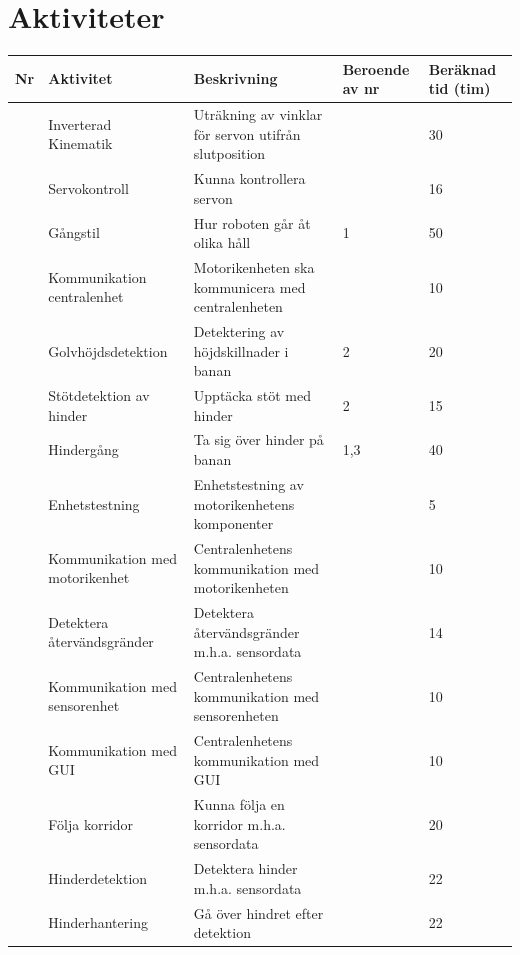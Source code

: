 \documentclass[a4paper,titlepage,12pt]{article}
\newcounter{aktNr}
\newcommand{\nextAktNr}{\stepcounter{aktNr}\arabic{aktNr}}
\begin{document}
	\section{Aktiviteter}
	\renewcommand*{\arraystretch}{1.4}
	\begin{longtable}[c]{ c p{4cm} p{6cm} p{2cm} p{2cm}}
		\textbf{Nr} & \textbf{Aktivitet} & \textbf{Beskrivning} & \textbf{Beroende av nr} & \textbf{Beräknad tid (tim)} \\ \midrule
		\nextAktNr{} & Inverterad Kinematik & Uträkning av vinklar för servon utifrån slutposition &  & 30 \\ \midrule
		\nextAktNr{} & Servokontroll & Kunna kontrollera servon &  & 16 \\ \midrule
		\nextAktNr{} & Gångstil & Hur roboten går åt olika håll & 1 & 50 \\ \midrule
		\nextAktNr{} & Kommunikation centralenhet & Motorikenheten ska kommunicera med centralenheten &  & 10 \\ \midrule
		\nextAktNr{} & Golvhöjdsdetektion & Detektering av höjdskillnader i banan & 2 & 20 \\ \midrule
		\nextAktNr{} & Stötdetektion av hinder & Upptäcka stöt med hinder & 2 & 15 \\ \midrule
		\nextAktNr{} & Hindergång & Ta sig över hinder på banan & 1,3 & 40 \\ \midrule
		\nextAktNr{} & Enhetstestning & Enhetstestning av motorikenhetens komponenter & & 5 \\ \midrule
		\nextAktNr{} & Kommunikation med motorikenhet & Centralenhetens kommunikation med motorikenheten &  & 10 \\ \midrule
		\nextAktNr{} & Detektera återvändsgränder & Detektera återvändsgränder
                                                m.h.a. sensordata &  & 14 \\ \midrule
		\nextAktNr{} & Kommunikation med sensorenhet & Centralenhetens kommunikation
                                                   med sensorenheten &  & 10 \\ \midrule
		\nextAktNr{} & Kommunikation med GUI & Centralenhetens kommunikation med GUI &  & 10 \\ \midrule
		\nextAktNr{} & Följa korridor & Kunna följa en korridor m.h.a. sensordata &  & 20 \\ \midrule
		\nextAktNr{} & Hinderdetektion & Detektera hinder m.h.a. sensordata &  & 22 \\ \midrule
		\nextAktNr{} & Hinderhantering & Gå över hindret efter detektion &  & 22 \\ \midrule

\end{longtable}
\end{document}
